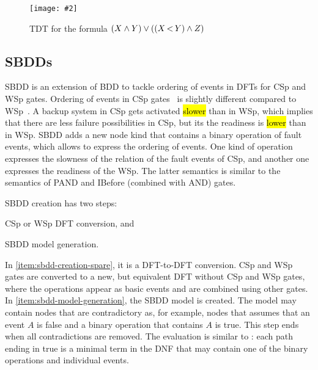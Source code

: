 \documentclass[12pt,openright,twoside,a4paper,oldfontcommands,english,brazil,draft]{abntex2}
\theoremstyle{theo}
\newcommand{\includegraphicsaspectratio}[2][1]{%
  \texttt{[image: \#2]}%
}
\newcommand{\parsin}[1]{\ensuremath\left( #1 \right)}
\def\pand{\ensuremath\operatorname{<}}
\begin{document}
\begin{figure}
  \centering
  \includegraphicsaspectratio[0.7]{dependency-tree-reduction}
  \caption{\acs*{TDT} for the formula $\parsin{X \land Y} \lor \parsin{\parsin{X \pand Y} \land Z}$}
  \label{fig:dependency-tree-reduction}
\end{figure}

\subsection{\Aclp*{SBDD}}
\label{sec:sbdd}

\Ac{SBDD} is an extension of \ac{BDD} to tackle ordering of events in \acp{DFT} for \ac{CSp} and \ac{WSp} gates.
Ordering of events in \ac{CSp} gates~\cite{XTD2012} is slightly different compared to \ac{WSp}~\cite{TXD2011}.
A backup system in \ac{CSp} gets activated \hl{slower}  than in \ac{WSp}, which implies that there are less failure possibilities in \ac{CSp}, but its the readiness is \hl{lower} than in \ac{WSp}.
\Ac{SBDD} adds a new node kind that contains a binary operation of fault events, which allows to express the ordering of events.
One kind of operation expresses the slowness of the relation of the fault events of \ac{CSp}, and another one expresses the readiness of the \ac{WSp}.
The latter semantics is similar to the semantics of \ac{PAND} and \ac{IBefore} (combined with \ac{AND}) gates.

\Ac{SBDD} creation has two steps:
\begin{alineasinline}
  \item \ac{CSp} or \ac{WSp} \ac{DFT} conversion, and \label{item:sbdd-creation-spare}
  \item \ac{SBDD} model generation.\label{item:sbdd-model-generation}
\end{alineasinline}
In \ref{item:sbdd-creation-spare}, it is a \ac{DFT}-to-\ac{DFT} conversion.
\Ac{CSp} and \ac{WSp} gates are converted to a new, but equivalent \ac{DFT} without \ac{CSp} and \ac{WSp} gates, where the operations appear as basic events and are combined using other gates.
In \ref{item:sbdd-model-generation}, the \ac{SBDD} model is created.
The model may contain nodes that are contradictory as, for example, nodes that assumes that an event $A$ is false and a binary operation that contains $A$ is true.
This step ends when all contradictions are removed.
The evaluation is similar to : each path ending in true is a minimal term in the \ac{DNF} that may contain one of the binary operations and individual events.
\end{document}
